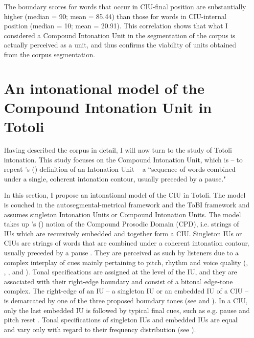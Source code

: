The boundary scores for words that  occur in CIU-final position are substantially higher (median = 90; mean = 85.44) than those for words in CIU-internal position (median = 10; mean = 20.91). This correlation shows that what I considered a Compound Intonation Unit in the segmentation of the corpus is actually perceived as a unit, and thus confirms the viability of units obtained from the corpus segmentation. 



\section[Intonational model]{An intonational model of the Compound Intonation Unit in Totoli}
\label{IU-model}



Having described the corpus in detail, I will now turn to the study of Totoli intonation.  This study focuses on the Compound Intonation Unit, which is -- to repeat \citeauthor{Chafe_1987}'s (\citeyear[22]{Chafe_1987})  definition of an Intonation Unit -- a ``sequence of words combined under a single, coherent intonation contour, usually preceded by a pause."	




In this section, I propose an intonational model of the CIU in Totoli. The model is couched in  the autosegmental-metrical  framework and the ToBI framework  \citep{arvaniti2020autosegmental, jun2006, jun_2014, Ladd_2008} and assumes  singleton Intonation Units or Compound Intonation Units. The model takes up \citeauthor{Ladd_2008}'s (\citeyear[297; chapter 8.2]{Ladd_2008}) notion of the Compound Prosodic Domain (CPD),  i.e. strings of IUs  which are recursively embedded and together form a CIU.  Singleton IUs or CIUs  are strings of words that are combined under a coherent intonation contour, usually preceded by a pause \citep[22]{Chafe_1987}. They are perceived as such by listeners due to a complex interplay of cues mainly pertaining to pitch, rhythm and voice quality (\citealt[93--155]{Schuetze-Coburn1994}, \citealt[260--270]{himmelmann2006challenges}, \citealt{dubois1992, dubois1993}, and \citealt[29--39]{cruttenden1997intonation}). Tonal specifications are assigned at the level of the IU, and they are associated with their right-edge boundary and consist of a bitonal edge-tone complex. The right-edge of  an IU -- a singleton IU or an embedded IU of a CIU -- is demarcated by one of the three proposed boundary tones (see   and ). In a CIU, only the last embedded IU is followed by typical final cues, such as e.g. pause and pitch reset \citep[217]{Schuetze-Coburn1991}. Tonal specifications of singleton IUs and embedded IUs are equal and vary only with regard to their frequency distribution (see   ). 

